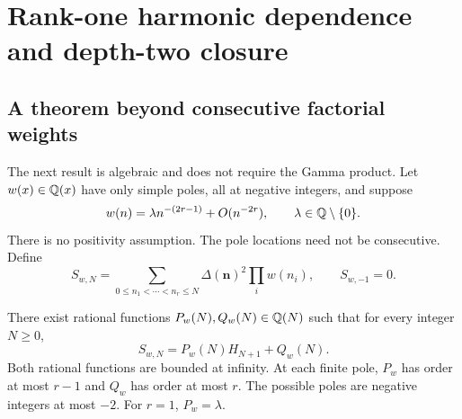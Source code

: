 \section{Rank-one harmonic dependence and depth-two closure}
\label{dhr:sec:depth}

\subsection{A theorem beyond consecutive factorial weights}
The next result is algebraic and does not require the Gamma product.
Let $w(x)\in\mathbb Q(x)$ have only simple poles, all at negative integers,
and suppose
\begin{equation}\label{dhr:eq:rational-weight-assumption}
 w(n)=\lambda n^{-(2r-1)}+O(n^{-2r}),\qquad
 \lambda\in\mathbb Q\setminus\{0\}.
\end{equation}
There is no positivity assumption. The pole locations need not be
consecutive. Define
\begin{equation}\label{dhr:eq:general-cutoff}
 S_{w,N}=\sum_{0\leq n_1<\cdots<n_r\leq N}
              \Delta(\bm n)^2\prod_iw(n_i),\qquad S_{w,-1}=0.
\end{equation}

\begin{theorem}\label{dhr:thm:rank-one}
There exist rational functions $P_w(N),Q_w(N)\in\mathbb Q(N)$ such that
for every integer $N\geq0$,
\begin{equation}\label{dhr:eq:rank-one-cutoff}
 \boxed{S_{w,N}=P_w(N)H_{N+1}+Q_w(N).}
\end{equation}
Both rational functions are bounded at infinity. At each finite pole,
$P_w$ has order at most $r-1$ and $Q_w$ has order at most $r$.
The possible poles are negative integers at most $-2$.
For $r=1$, $P_w=\lambda$.
\end{theorem}


